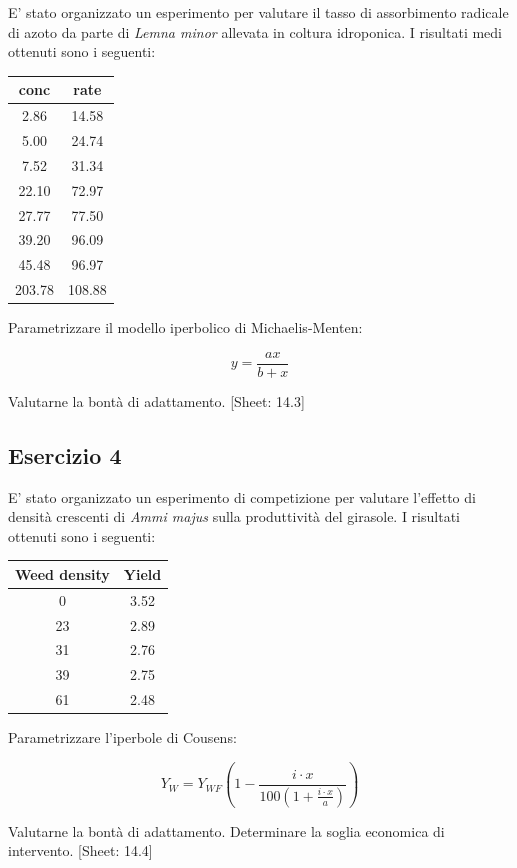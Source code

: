 \documentclass[a4paper,12pt,oneside]{book}
\begin{document}
E' stato organizzato un esperimento per valutare il tasso di assorbimento radicale di azoto da parte di \emph{Lemna minor} allevata in coltura idroponica. I risultati medi ottenuti sono i seguenti:

\begin{longtable}[]{@{}cc@{}}
\toprule
conc & rate \\
\midrule
\endhead
2.86 & 14.58 \\
5.00 & 24.74 \\
7.52 & 31.34 \\
22.10 & 72.97 \\
27.77 & 77.50 \\
39.20 & 96.09 \\
45.48 & 96.97 \\
203.78 & 108.88 \\
\bottomrule
\end{longtable}

Parametrizzare il modello iperbolico di Michaelis-Menten:

\[y = \frac{a x} {b + x}\]

Valutarne la bontà di adattamento.
{[}Sheet: 14.3{]}

\hypertarget{esercizio-4-7}{%
\subsection{Esercizio 4}\label{esercizio-4-7}}

E' stato organizzato un esperimento di competizione per valutare l'effetto di densità crescenti di \emph{Ammi majus} sulla produttività del girasole. I risultati ottenuti sono i seguenti:

\begin{longtable}[]{@{}cc@{}}
\toprule
Weed density & Yield \\
\midrule
\endhead
0 & 3.52 \\
23 & 2.89 \\
31 & 2.76 \\
39 & 2.75 \\
61 & 2.48 \\
\bottomrule
\end{longtable}

Parametrizzare l'iperbole di Cousens:

\[Y_W  = Y_{WF} \left( 1 - \frac{i \cdot x}{100\left( 1 + \frac{i \cdot x}{a} \right)} \right)\]

Valutarne la bontà di adattamento. Determinare la soglia economica di intervento.
{[}Sheet: 14.4{]}
\end{document}
